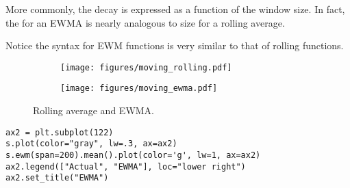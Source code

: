 More commonly, the decay is expressed as a function of the window size.
In fact, the  for an EWMA is nearly analogous to  size for a rolling average.

Notice the syntax for EWM functions is very similar to that of rolling functions.

\begin{figure}[H] %
\captionsetup[subfigure]{justification=centering}
\centering
\begin{subfigure}{.49\textwidth}
    \centering
    \texttt{[image: figures/moving\_rolling.pdf]}
    \caption{}
    \label{fig:pandas-ts-moving-rolling}
\end{subfigure}
%
\begin{subfigure}{.49\textwidth}
    \centering
    \texttt{[image: figures/moving\_ewma.pdf]}
    \caption{}
    \label{fig:pandas-ts-moving-ewma}
\end{subfigure}
\caption{Rolling average and EWMA.}
\end{figure}

\begin{lstlisting}
ax2 = plt.subplot(122)
s.plot(color="gray", lw=.3, ax=ax2)
s.ewm(span=200).mean().plot(color='g', lw=1, ax=ax2)
ax2.legend(["Actual", "EWMA"], loc="lower right")
ax2.set_title("EWMA")
\end{lstlisting}

\begin{comment}
\begin{problem}
Plot the following from the DJIA dataset with a window or span of 30, 120, and 365.
\begin{itemize}
    \item The original data points.
    \item Rolling average.
    \item Exponential average.
\end{itemize}
Your plots should look like Figure \ref{fig:prob6}.
Return a list of the minimum rolling average value for each window size and a list of the minimum exponential average value for each span size.
\label{prob:rolling}
\end{problem}

\begin{figure}[H]
\texttt{[image: figures/prob6.pdf]}
\caption{Plots for Problem \ref{prob:rolling}.}
\label{fig:prob6}
\end{figure}
\end{comment}